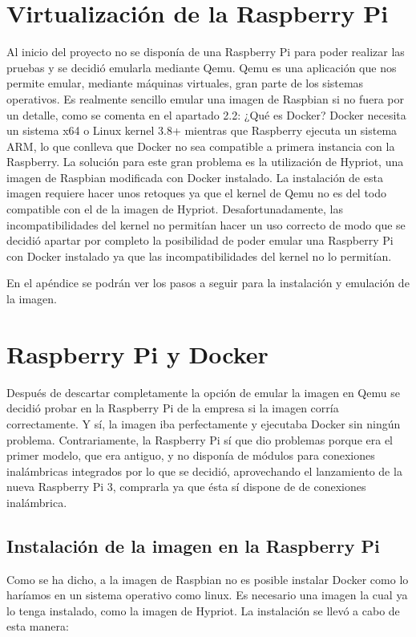 \section{Virtualización de la Raspberry Pi}

Al inicio del proyecto no se disponía de una Raspberry Pi para poder realizar las pruebas y se decidió emularla mediante Qemu. 
Qemu es una aplicación que nos permite emular, mediante máquinas virtuales, gran parte de los sistemas operativos. 
Es realmente sencillo emular una imagen de Raspbian si no fuera por un detalle, como se comenta en el apartado 2.2: ¿Qué es Docker? Docker necesita un sistema x64 o Linux kernel 3.8+ mientras que Raspberry ejecuta un sistema ARM, lo que conlleva que Docker no sea compatible a primera instancia con la Raspberry. 
La solución para este gran problema es la utilización de Hypriot, una imagen de Raspbian modificada con Docker instalado. 
La instalación de esta imagen requiere hacer unos retoques ya que el kernel de Qemu no es del todo compatible con el de la imagen de Hypriot. Desafortunadamente, las incompatibilidades del kernel no permitían hacer un uso correcto de modo que se decidió apartar por completo la posibilidad de poder emular una Raspberry Pi con Docker instalado ya que las incompatibilidades del kernel no lo permitían.

En el apéndice se podrán ver los pasos a seguir para la instalación y emulación de la imagen. 

\section{Raspberry Pi y Docker}

Después de descartar completamente la opción de emular la imagen en Qemu se decidió probar en la Raspberry Pi de la empresa si la imagen corría correctamente. Y sí, la imagen iba perfectamente y ejecutaba Docker sin ningún problema. Contrariamente, la Raspberry Pi sí que dio problemas porque era el primer modelo, que era antiguo, y no disponía de módulos para conexiones inalámbricas integrados por lo que se decidió, aprovechando el lanzamiento de la nueva Raspberry Pi 3, comprarla ya que ésta sí dispone de de conexiones inalámbrica. 

\subsection{Instalación de la imagen en la Raspberry Pi}

Como se ha dicho, a la imagen de Raspbian no es posible instalar Docker como lo haríamos en un sistema operativo como linux. Es necesario una imagen la cual ya lo tenga instalado, como la imagen de Hypriot. La instalación se llevó a cabo de esta manera:

